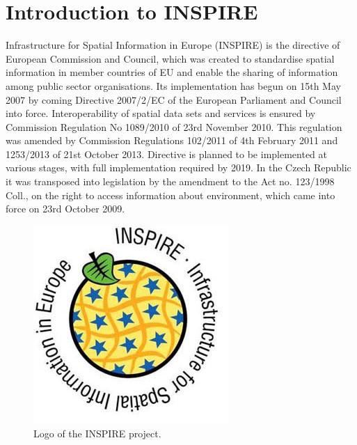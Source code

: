 \documentclass[eprint]{actapoly}
\begin{document}
\section{Introduction to INSPIRE}
Infrastructure for Spatial Information in Europe (INSPIRE) is the directive of European Commission and Council, which was created to standardise spatial information in member countries of EU and enable the sharing of information among public sector organisations. Its implementation has begun on 15th May 2007 by coming Directive 2007/2/EC of the European Parliament and Council into force. Interoperability of spatial data sets and services is ensured by Commission Regulation No 1089/2010 of 23rd November 2010. This regulation was amended by Commission Regulations 102/2011 of 4th February 2011 and 1253/2013 of 21st October 2013. Directive is planned to be implemented at various stages, with full implementation required by 2019. In the Czech Republic it was transposed into legislation by the amendment to the Act no. 123/1998 Coll., on the right to access information about environment, which came into force on 23rd October 2009. 

\begin{figure}
\centering
\includegraphics[width=0.8\linewidth]{pics/inspire_logo.png} %
\caption{Logo of the INSPIRE project.}
\label{fig:feature_catalogue}
\end{figure}
\end{document}
